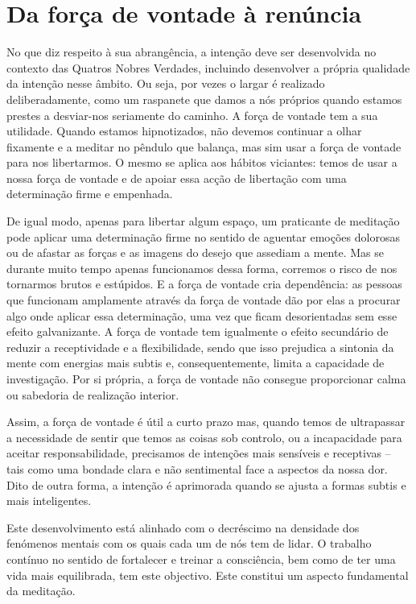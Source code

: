 \section{Da força de vontade à renúncia}

No que diz respeito à sua abrangência, a intenção deve ser desenvolvida no contexto das Quatros Nobres Verdades, incluindo desenvolver a própria qualidade da intenção nesse âmbito. Ou seja, por vezes o largar é realizado deliberadamente, como um raspanete que damos a nós próprios quando estamos prestes a desviar-nos seriamente do caminho. A força de vontade tem a sua utilidade. Quando estamos hipnotizados, não devemos continuar a olhar fixamente e a meditar no pêndulo que balança, mas sim usar a força de vontade para nos libertarmos. O mesmo se aplica aos hábitos viciantes: temos de usar a nossa força de vontade e de apoiar essa acção de libertação com uma determinação firme e empenhada.

De igual modo, apenas para libertar algum espaço, um praticante de meditação pode aplicar uma determinação firme no sentido de aguentar emoções dolorosas ou de afastar as forças e as imagens do desejo que assediam a mente. Mas se durante muito tempo apenas funcionamos dessa forma, corremos o risco de nos tornarmos brutos e estúpidos. E a força de vontade cria dependência: as pessoas que funcionam amplamente através da força de vontade dão por elas a procurar algo onde aplicar essa determinação, uma vez que ficam desorientadas sem esse efeito galvanizante. A força de vontade tem igualmente o efeito secundário de reduzir a receptividade e a flexibilidade, sendo que isso prejudica a sintonia da mente com energias mais subtis e, consequentemente, limita a capacidade de investigação. Por si própria, a força de vontade não consegue proporcionar calma ou sabedoria de realização interior.

Assim, a força de vontade é útil a curto prazo mas, quando temos de ultrapassar a necessidade de sentir que temos as coisas sob controlo, ou a incapacidade para aceitar responsabilidade, precisamos de intenções mais sensíveis e receptivas -- tais como uma bondade clara e não sentimental face a aspectos da nossa dor. Dito de outra forma, a intenção é aprimorada quando se ajusta a formas subtis e mais inteligentes.

Este desenvolvimento está alinhado com o decréscimo na densidade dos fenómenos mentais com os quais cada um de nós tem de lidar. O trabalho contínuo no sentido de fortalecer e treinar a consciência, bem como de ter uma vida mais equilibrada, tem este objectivo. Este constitui um aspecto fundamental da meditação.

